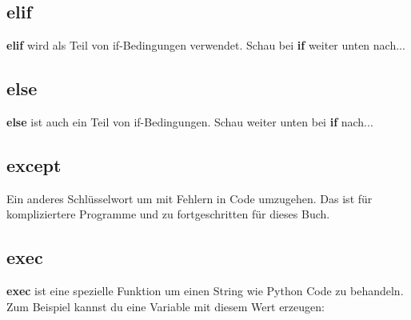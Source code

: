\subsection*{elif}

\textbf{elif} wird als Teil von if-Bedingungen verwendet. Schau bei \textbf{if} weiter unten nach...

\subsection*{else}

\textbf{else} ist auch ein Teil von if-Bedingungen. Schau weiter unten bei \textbf{if} nach...

\subsection*{except}

Ein anderes Schlüsselwort um mit Fehlern in Code umzugehen. Das ist für kompliziertere Programme und zu fortgeschritten für dieses Buch.

\subsection*{exec}

\textbf{exec} ist eine spezielle Funktion um einen String wie Python Code zu behandeln. Zum Beispiel kannst du eine Variable mit diesem Wert erzeugen:

